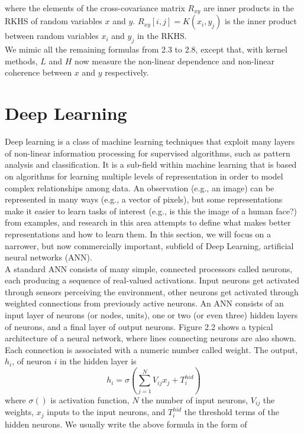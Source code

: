 \documentclass[12pt]{report} %
\begin{document}
where the elements of the cross-covariance matrix $R_{xy}$ are inner products in the RKHS of random variables $x$ and $y$. $R_{xy}[i,j]=K(x_{i},y_{j})$ is the inner product between random variables $x_{i}$ and $y_{j}$ in the RKHS. \\
We mimic all the remaining formulas from 2.3 to 2.8, except that, with kernel methods, $L$ and $H$ now measure the non-linear dependence and non-linear coherence between $x$ and $y$ respectively.

\section{Deep Learning}
Deep learning is a class of machine learning techniques that exploit many layers of non-linear information processing for supervised algorithms, such as pattern analysis and classification. It is a sub-field within machine learning that is based on algorithms for learning multiple levels of representation in order to model complex relationships among data. An observation (e.g., an image) can be represented in many ways (e.g., a vector of pixels), but some representations make it easier to learn tasks of interest (e.g.,
is this the image of a human face?) from examples, and research in this area attempts to define what makes better representations and how to learn them\cite{DL}. In this section, we will focus on a narrower, but now commercially important, subfield of Deep Learning,  artificial neural networks (ANN).\\
A standard ANN consists of many simple, connected processors called neurons, each producing a sequence of real-valued activations. Input neurons get activated through sensors perceiving the environment, other neurons get activated through weighted connections from previously active neurons\cite{NN}. An ANN consists of an input layer of neurons (or nodes, units), one or two (or even three) hidden layers of neurons, and a final layer of output neurons. Figure 2.2 shows a typical architecture of a neural network, where lines connecting neurons are also shown. Each connection is associated with a numeric number called weight. The output, $h_{i}$, of neuron $i$ in the hidden layer is
\begin{equation}
h_{i}=\sigma(\sum _{j=1}^{N}V_{ij}x_{j}+T_{i}^{hid})
\end{equation}
where $\sigma()$ is activation function, $N$ the number of input neurons,  $V_{ij}$ the weights, $x_{j}$ inputs to the input neurons, and $T_{i}^{hid}$ the threshold terms of the hidden neurons\cite{NN2}. We usually write the above formula in the form of
\end{document}
